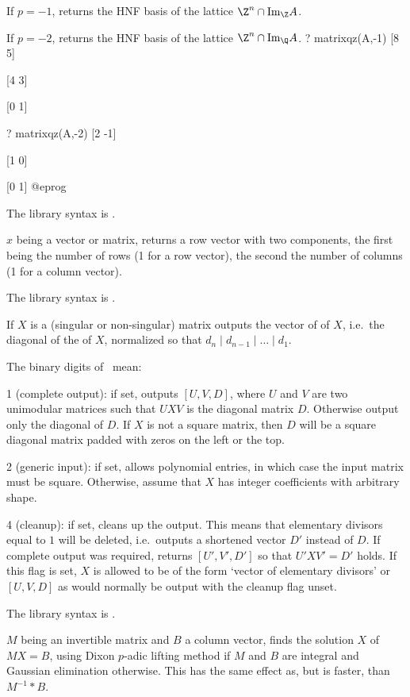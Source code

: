 If $p=-1$, returns the HNF basis of the lattice $\Z^n \cap \text{Im}_\Z A$.

If $p=-2$, returns the HNF basis of the lattice $\Z^n \cap \text{Im}_\Q A$.
\bprog
? matrixqz(A,-1)
[8 5]

[4 3]

[0 1]

? matrixqz(A,-2)
[2 -1]

[1 0]

[0 1]
@eprog

The library syntax is .

\label{se:matsize}
$x$ being a vector or matrix, returns a row vector
with two components, the first being the number of rows (1 for a row vector),
the second the number of columns (1 for a column vector).

The library syntax is .

\label{se:matsnf}
If $X$ is a (singular or non-singular) matrix outputs the vector of
 of $X$, i.e.~the diagonal of the
 of $X$, normalized so that $d_n \mid d_{n-1} \mid
\ldots \mid d_1$.

The binary digits of \fl\ mean:

1 (complete output): if set, outputs $[U,V,D]$, where $U$ and $V$ are two
unimodular matrices such that $UXV$ is the diagonal matrix $D$. Otherwise
output only the diagonal of $D$. If $X$ is not a square matrix, then $D$
will be a square diagonal matrix padded with zeros on the left or the top.

2 (generic input): if set, allows polynomial entries, in which case the
input matrix must be square. Otherwise, assume that $X$ has integer
coefficients with arbitrary shape.

4 (cleanup): if set, cleans up the output. This means that elementary
divisors equal to $1$ will be deleted, i.e.~outputs a shortened vector $D'$
instead of $D$. If complete output was required, returns $[U',V',D']$ so
that $U'XV' = D'$ holds. If this flag is set, $X$ is allowed to be of the
form `vector of elementary divisors' or $[U,V,D]$ as would normally be output with the cleanup flag
unset.

The library syntax is .

\label{se:matsolve}
$M$ being an invertible matrix and $B$ a column
vector, finds the solution $X$ of $MX=B$, using Dixon $p$-adic lifting method
if $M$ and $B$ are integral and Gaussian elimination otherwise. This
has the same effect as, but is faster, than $M^{-1}*B$.

